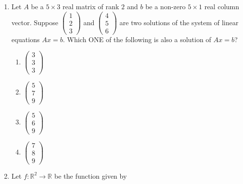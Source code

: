 \begin{enumerate}
\begin{enumerate}[label=(\Alph*)]
\item If $f$ is a polynomial in $x$ of degree at most $5$, then $f^{(6)}(x)=0$ for all $x\in\mathbb R$.
\item If $f^{(6)}(x)=0$ for all $x\in\mathbb R$, then $f$ is a polynomial in $x$ of degree at most $5$.
\item If $f^{(k)}(a)=0$ for all $1\le k\le5$ and $f^{(6)}(a)>0$ for some $a\in\mathbb R$, then $f(x)$ has a local minimum at $a$.
\item If $f^{(k)}(a)=0$ for all $1\le k\le6$ and $f^{(7)}(a)<0$ for some $a\in\mathbb R$, then $f(x)$ has a local maximum at $a$.
\end{enumerate}
\item Let $A$ be a $5\times3$ real matrix of rank $2$ and $b$ be a non-zero $5\times1$ real column vector. Suppose $\begin{pmatrix}1\\2\\3\end{pmatrix}$ and $\begin{pmatrix}4\\5\\6\end{pmatrix}$ are two solutions of the system of linear equations $Ax=b$. Which ONE of the following is also a solution of $Ax=b$?
\begin{enumerate}[label=(\Alph*)]
\item $\begin{pmatrix}3\\3\\3\end{pmatrix}$
\item $\begin{pmatrix}5\\7\\9\end{pmatrix}$
\item $\begin{pmatrix}5\\6\\9\end{pmatrix}$
\item $\begin{pmatrix}7\\8\\9\end{pmatrix}$
\end{enumerate}
\item Let $f:\mathbb R^2\to\mathbb R$ be the function given by

\end{enumerate}
